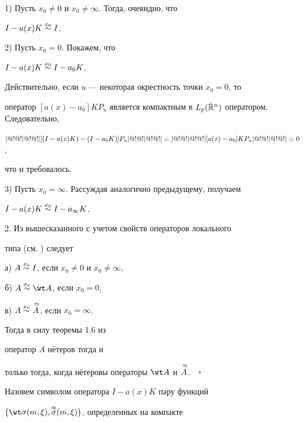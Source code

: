 1) Пусть $x_0\ne 0$ и $x_0\ne\infty$. Тогда, очевидно, что


$I-a(x)K \overset{x_0}{\sim}{} I$.





2) Пусть $x_0=0$. Покажем, что


$I-a(x)K \overset{x_0}{\sim}{} I-a_0K$.





Действительно, если $u$ --- некоторая окрестность точки $x_0=0$, то


оператор $[a(x)-a_0]KP_u$ является компактным в $L_p(\dot{\Bbb


R}^n)$ оператором. Следовательно,


$\trivert[(I-a(x)K)-(I-a_0K)]P_u


\trivert=\trivert[a(x)-a_0]KP_u\trivert=0$,


что и требовалось.





3) Пусть $x_0=\infty$. Рассуждая аналогично предыдущему, получаем


$I-a(x)K \overset{x_0}{\sim}{} I-a_\infty K$.





2. Из вышесказанного с учетом свойств операторов локального


типа (см. \cite{b4}) следует





а) $A\overset{x_0}{\sim}{} I$, если $x_0\ne 0$ и $x_0\ne \infty$,





б) $A\xO \wt A$, если $x_0=0$,





в) $A\overset{x_0}{\sim}{} \overset{\;\approx}{A}{}$, если $x_0=\infty$.





\noindent{}Тогда в силу теоремы 1.6 из \cite{b4}


оператор $A$ н\"етеров тогда и


только тогда, когда н\"етеровы операторы $\wt A$ и $\overset{\;\approx}{A}{}$.$\quad\square$





Назовем символом оператора $I-a(x)K$ пару функций


$\big(\wt\sigma(m,\xi),\apsigma(m,\xi)\big)$, определенных на компакте


